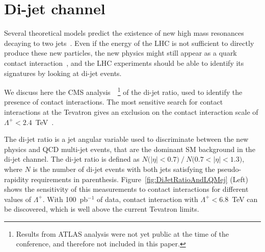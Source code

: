 \documentclass{cmspaper}
\begin{document}
\section{Di-jet channel} \label{dijet}
Several theoretical models predict the existence of new 
high mass resonances decaying to two 
jets~\cite{Baur:1989kv,Bagger:1987fz,Angelopoulos:1986uq}.
Even if the energy of the LHC is not sufficient to directly produce 
these new particles, the new physics might still appear as 
a quark contact interaction~\cite{Eichten:1983hw}, 
and the LHC experiments should 
be able to identify its signatures by looking at di-jet events.

We discuss here the CMS analysis~\cite{DIJETSNOTE}~\footnote{Results 
from ATLAS analysis were not yet public at the time 
of the conference, and therefore not included in this paper.}
of the di-jet ratio, used to identify the presence of contact interactions. 
The most sensitive search for contact interactions at the Tevatron 
gives an exclusion on the contact interaction scale 
of $\Lambda^{+} < 2.4$~TeV~\cite{Abbott:1998wh}.  

The di-jet ratio is a jet angular variable used to 
discriminate between the new physics and QCD multi-jet events, 
that are the dominant SM background in the di-jet channel. The di-jet ratio is 
defined as $N\mbox{(}|\eta|<0.7\mbox{)}~/~N\mbox{(}0.7<|\eta|< 1.3 \mbox{)}$, 
where $N$ is the number of di-jet events with both jets satisfying the 
pseudo-rapidity requirements in parenthesis. 
Figure~\ref{fig:DiJetRatioAndLQMej} (Left) shows the sensitivity of this 
measurements to contact interactions for different values of $\Lambda^{+}$. 
With 100~pb$^{-1}$ of data, contact interaction with
$\Lambda^{+} < 6.8$~TeV can be discovered, which is well above the 
current Tevatron limits.
 
\end{document}
